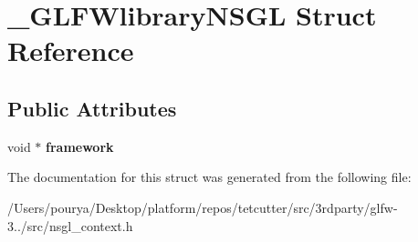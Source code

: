 \hypertarget{struct__GLFWlibraryNSGL}{}\section{\+\_\+\+G\+L\+F\+Wlibrary\+N\+S\+G\+L Struct Reference}
\label{struct__GLFWlibraryNSGL}
\subsection*{Public Attributes}
\begin{DoxyCompactItemize}
\item 
\hypertarget{struct__GLFWlibraryNSGL_a220ef0e3f40d802382397a80d472ee30}{}void $\ast$ {\bfseries framework}\label{struct__GLFWlibraryNSGL_a220ef0e3f40d802382397a80d472ee30}

\end{DoxyCompactItemize}


The documentation for this struct was generated from the following file\+:\begin{DoxyCompactItemize}
\item 
/\+Users/pourya/\+Desktop/platform/repos/tetcutter/src/3rdparty/glfw-\/3../src/nsgl\+\_\+context.\+h\end{DoxyCompactItemize}
